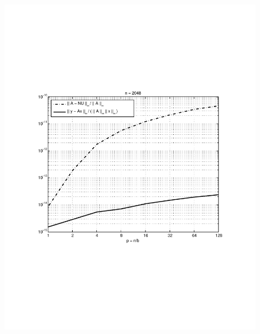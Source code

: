 \documentclass{article}
\begin{document}
\begin{figure}
\begin{minipage}{0.45 \textwidth}
\includegraphics[width=1.00 \textwidth]{images/results_random_nb_n2048_001_bw.pdf}
\end{minipage}
\begin{minipage}{0.45 \textwidth}

\end{minipage}
\end{figure}
\end{document}
